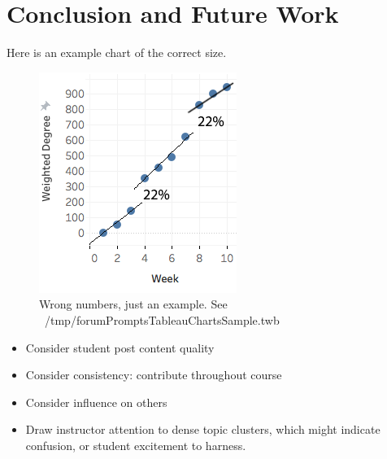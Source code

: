 \section{Conclusion and Future Work}

Here is an example chart of the correct size.
\begin{figure}[htp]
       \centering
       \includegraphics{Figs/exampleChart1.png}
       \caption{\textnormal{Wrong numbers, just an example. See ~/tmp/forumPromptsTableauChartsSample.twb}}
       \label{fig:exampleChart}
\end{figure}


\begin{itemize}
\item Consider student post content quality
\item Consider consistency: contribute throughout course
\item Consider influence on others
\item Draw instructor attention to dense topic clusters, which might
  indicate confusion, or student excitement to harness.
\end{itemize}
